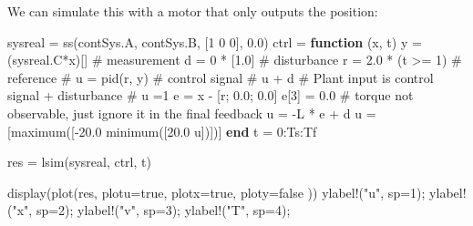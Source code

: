 \documentclass[
  8pt,
  a4paper,
]{book}
\newenvironment{Shaded}{\begin{snugshade}}{\end{snugshade}}
\newcommand{\CommentTok}[1]{\textcolor[rgb]{0.37,0.37,0.37}{#1}}
\newcommand{\ConstantTok}[1]{\textcolor[rgb]{0.56,0.35,0.01}{#1}}
\newcommand{\FloatTok}[1]{\textcolor[rgb]{0.68,0.00,0.00}{#1}}
\newcommand{\FunctionTok}[1]{\textcolor[rgb]{0.28,0.35,0.67}{#1}}
\newcommand{\KeywordTok}[1]{\textcolor[rgb]{0.00,0.23,0.31}{\textbf{#1}}}
\newcommand{\NormalTok}[1]{\textcolor[rgb]{0.00,0.23,0.31}{#1}}
\newcommand{\OperatorTok}[1]{\textcolor[rgb]{0.37,0.37,0.37}{#1}}
\newcommand{\StringTok}[1]{\textcolor[rgb]{0.13,0.47,0.30}{#1}}
\begin{document}
We can simulate this with a motor that only outputs the position:

\begin{Shaded}
\begin{Highlighting}[]
\NormalTok{sysreal }\OperatorTok{=} \FunctionTok{ss}\NormalTok{(contSys.A, contSys.B, [}\FloatTok{1} \FloatTok{0} \FloatTok{0}\NormalTok{], }\FloatTok{0.0}\NormalTok{)}
\NormalTok{ctrl }\OperatorTok{=} \KeywordTok{function}\NormalTok{ (x, t)}
\NormalTok{    y }\OperatorTok{=}\NormalTok{ (sysreal.C}\OperatorTok{*}\NormalTok{x)[] }\CommentTok{\# measurement}
\NormalTok{    d }\OperatorTok{=} \FloatTok{0} \OperatorTok{*}\NormalTok{ [}\FloatTok{1.0}\NormalTok{]        }\CommentTok{\# disturbance}
\NormalTok{    r }\OperatorTok{=} \FloatTok{2.0} \OperatorTok{*}\NormalTok{ (t }\OperatorTok{\textgreater{}=} \FloatTok{1}\NormalTok{) }\CommentTok{\# reference}
    \CommentTok{\# u = pid(r, y) \# control signal}
    \CommentTok{\# u + d \# Plant input is control signal + disturbance}
    \CommentTok{\# u =1}
    \ConstantTok{e} \OperatorTok{=}\NormalTok{ x }\OperatorTok{{-}}\NormalTok{ [r; }\FloatTok{0.0}\NormalTok{; }\FloatTok{0.0}\NormalTok{]}
    \ConstantTok{e}\NormalTok{[}\FloatTok{3}\NormalTok{] }\OperatorTok{=} \FloatTok{0.0} \CommentTok{\# torque not observable, just ignore it in the final feedback}
\NormalTok{    u }\OperatorTok{=} \OperatorTok{{-}}\NormalTok{L }\OperatorTok{*} \ConstantTok{e} \OperatorTok{+}\NormalTok{ d}
\NormalTok{    u }\OperatorTok{=}\NormalTok{ [}\FunctionTok{maximum}\NormalTok{([}\OperatorTok{{-}}\FloatTok{20.0} \FunctionTok{minimum}\NormalTok{([}\FloatTok{20.0}\NormalTok{ u])])]}
\KeywordTok{end}
\NormalTok{t }\OperatorTok{=} \FloatTok{0}\OperatorTok{:}\NormalTok{Ts}\OperatorTok{:}\NormalTok{Tf}

\NormalTok{res }\OperatorTok{=} \FunctionTok{lsim}\NormalTok{(sysreal, ctrl, t)}

\FunctionTok{display}\NormalTok{(}\FunctionTok{plot}\NormalTok{(res, }
\NormalTok{    plotu}\OperatorTok{=}\ConstantTok{true}\NormalTok{, }
\NormalTok{    plotx}\OperatorTok{=}\ConstantTok{true}\NormalTok{, }
\NormalTok{    ploty}\OperatorTok{=}\ConstantTok{false}
\NormalTok{    ))}
\FunctionTok{ylabel!}\NormalTok{(}\StringTok{"u"}\NormalTok{, sp}\OperatorTok{=}\FloatTok{1}\NormalTok{);}
\FunctionTok{ylabel!}\NormalTok{(}\StringTok{"x"}\NormalTok{, sp}\OperatorTok{=}\FloatTok{2}\NormalTok{);}
\FunctionTok{ylabel!}\NormalTok{(}\StringTok{"v"}\NormalTok{, sp}\OperatorTok{=}\FloatTok{3}\NormalTok{);}
\FunctionTok{ylabel!}\NormalTok{(}\StringTok{"T"}\NormalTok{, sp}\OperatorTok{=}\FloatTok{4}\NormalTok{);}
\end{Highlighting}
\end{Shaded}
\end{document}
